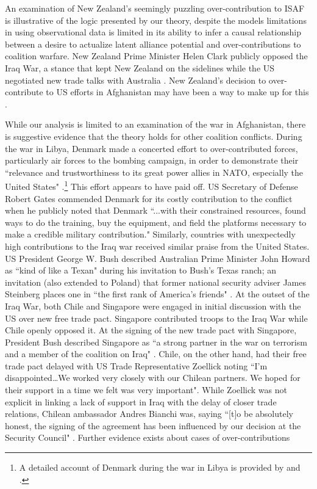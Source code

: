 \documentclass[12pt,letterpaper]{article}
\begin{document}
	An examination of New Zealand's seemingly puzzling over-contribution to ISAF is illustrative of the logic presented by our theory, despite the models limitations in using observational data is limited in its ability to infer a causal relationship between a desire to actualize latent alliance potential and over-contributions to coalition warfare. New Zealand Prime Minister Helen Clark publicly opposed the Iraq War, a stance that kept New Zealand on the sidelines while the US negotiated new trade talks with Australia \citep{armstrong_alliesrewardedtrade_2003}. New Zealand's decision to over-contribute to US efforts in Afghanistan may have been a way to make up for this \citep{wellings_narrativealignmentmisalignment_2018}.

	While our analysis is limited to an examination of the war in Afghanistan, there is suggestive evidence that the theory holds for other coalition conflicts. During the war in Libya, Denmark made a concerted effort to over-contributed forces, particularly air forces to the bombing campaign, in order to demonstrate their ``relevance and trustworthiness to its great power allies in NATO, especially the United States" \citep[109]{jakobsen_goodnewslibya_2012}.\footnote{A detailed account of Denmark during the war in Libya is provided by \citet{dicke_natoburdensharinglibya_2013} and \citet{jakobsen_prestigeseekingsmallstates_2018}.} This effort appears to have paid off. US Secretary of Defense Robert Gates \citet{gates_securitydefenseagenda_2011} commended Denmark for its costly contribution to the conflict when he publicly noted that Denmark ``...with their constrained resources, found ways to do the training, buy the equipment, and field the platforms necessary to make a credible military contribution." Similarly, countries with unexpectedly high contributions to the Iraq war received similar praise from the United States. US President George W. Bush described Australian Prime Minister John Howard as ``kind of like a Texan" during his invitation to Bush's Texas ranch; an invitation (also extended to Poland) that former national security adviser James Steinberg places one in ``the first rank of America's friends" \citep{sanger_meanwhilebackranch_2003}. At the outset of the Iraq War, both Chile and Singapore were engaged in initial discussion with the US over new free trade pact. Singapore contributed troops to the Iraq War while Chile openly opposed it. At the signing of the new trade pact with Singapore, President Bush described Singapore as ``a strong partner in the war on terrorism and a member of the coalition on Iraq" \citep{armstrong_alliesrewardedtrade_2003}. Chile, on the other hand, had their free trade pact delayed with US Trade Representative Zoellick noting ``I'm disappointed\ldots We worked very closely with our Chilean partners. We hoped for their support in a time we felt was very important". While Zoellick was not explicit in linking a lack of support in Iraq with the delay of closer trade relations, Chilean ambassador Andres Bianchi was, saying ``[t]o be absolutely honest, the signing of the agreement has been influenced by our decision at the Security Council" \citep{armstrong_alliesrewardedtrade_2003}. Further evidence exists about cases of over-contributions 
\end{document}
